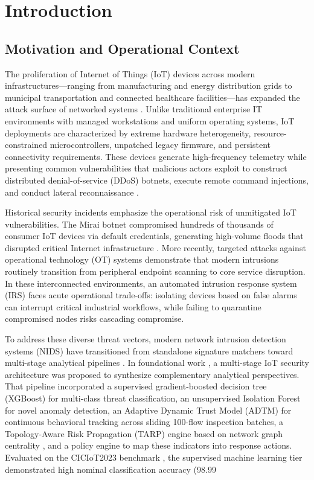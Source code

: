 \documentclass[journal,10pt,onecolumn]{IEEEtran}
\begin{document}
\section{Introduction}


\subsection{Motivation and Operational Context}
The proliferation of Internet of Things (IoT) devices across modern infrastructures—ranging from manufacturing and energy distribution grids to municipal transportation and connected healthcare facilities—has expanded the attack surface of networked systems \cite{18, 19}. Unlike traditional enterprise IT environments with managed workstations and uniform operating systems, IoT deployments are characterized by extreme hardware heterogeneity, resource-constrained microcontrollers, unpatched legacy firmware, and persistent connectivity requirements. These devices generate high-frequency telemetry while presenting common vulnerabilities that malicious actors exploit to construct distributed denial-of-service (DDoS) botnets, execute remote command injections, and conduct lateral reconnaissance \cite{19, 31}.

Historical security incidents emphasize the operational risk of unmitigated IoT vulnerabilities. The Mirai botnet compromised hundreds of thousands of consumer IoT devices via default credentials, generating high-volume floods that disrupted critical Internet infrastructure \cite{18, 19}. More recently, targeted attacks against operational technology (OT) systems demonstrate that modern intrusions routinely transition from peripheral endpoint scanning to core service disruption. In these interconnected environments, an automated intrusion response system (IRS) faces acute operational trade-offs: isolating devices based on false alarms can interrupt critical industrial workflows, while failing to quarantine compromised nodes risks cascading compromise.

To address these diverse threat vectors, modern network intrusion detection systems (NIDS) have transitioned from standalone signature matchers toward multi-stage analytical pipelines \cite{21, 22}. In foundational work \cite{1}, a multi-stage IoT security architecture was proposed to synthesize complementary analytical perspectives. That pipeline incorporated a supervised gradient-boosted decision tree (XGBoost) \cite{8} for multi-class threat classification, an unsupervised Isolation Forest \cite{15} for novel anomaly detection, an Adaptive Dynamic Trust Model (ADTM) for continuous behavioral tracking across sliding 100-flow inspection batches, a Topology-Aware Risk Propagation (TARP) engine based on network graph centrality \cite{12}, and a policy engine to map these indicators into response actions. Evaluated on the CICIoT2023 benchmark \cite{3}, the supervised machine learning tier demonstrated high nominal classification accuracy (98.99%
\end{document}

